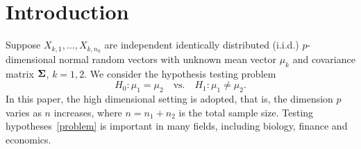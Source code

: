 \documentclass[3p]{elsarticle}
\theoremstyle{plain}
\theoremstyle{definition}
\theoremstyle{remark}
\begin{document}



\section{Introduction}

Suppose $X_{k,1},\ldots,X_{k,n_k}$  are independent identically distributed (i.i.d.) $p$-dimensional normal random vectors with unknown mean vector $\mu_k$ and covariance matrix $\boldsymbol{\Sigma}$, $k=1,2$. We consider the hypothesis testing problem
\begin{equation}\label{problem}
    H_0:\mu_1=\mu_2\quad \textrm{vs.}\quad H_1:\mu_1\neq \mu_2.
\end{equation}
 In this paper, {the} high dimensional setting is adopted, that is, the dimension $p$ varies as $n$ increases, where $n=n_1+n_2$ is the total sample size.
Testing hypotheses~\eqref{problem} is important in many fields, including biology, finance and economics.
\end{document}
